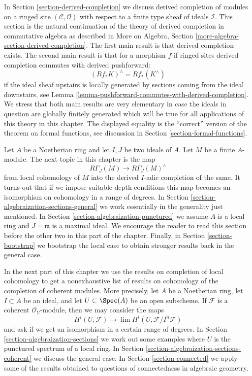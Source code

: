 \medskip\noindent
In Section \ref{section-derived-completion} we discuss derived completion
of modules on a ringed site $(\mathcal{C}, \mathcal{O})$
with respect to a finite type sheaf of ideals $\mathcal{I}$.
This section is the natural continuation of the theory of derived completion
in commutative algebra as described in
More on Algebra, Section \ref{more-algebra-section-derived-completion}.
The first main result is that derived completion exists.
The second main result is that for a morphism $f$ if ringed sites
derived completion commutes with derived pushforward:
$$
(Rf_*K)^\wedge = Rf_*(K^\wedge)
$$
if the ideal sheaf upstairs is locally generated by sections coming
from the ideal downstairs, see
Lemma \ref{lemma-pushforward-commutes-with-derived-completion}.
We stress that both main results are very elementary in case the
ideals in question are globally finitely generated which will
be true for all applications of this theory in this chapter.
The displayed equality is the ``correct'' version of the
theorem on formal functions, see discussion in
Section \ref{section-formal-functions}.

\medskip\noindent
Let $A$ be a Noetherian ring and let $I, J$ be two ideals of $A$.
Let $M$ be a finite $A$-module.
The next topic in this chapter is the map
$$
R\Gamma_J(M) \longrightarrow R\Gamma_J(M)^\wedge
$$
from local cohomology of $M$ into the derived $I$-adic completion
of the same. It turns out that if we impose suitable depth conditions
this map becomes an isomorphism on cohomology in a range of degrees.
In Section \ref{section-algebraization-sections-general}
we work essentially in the generality just mentioned.
In Section \ref{section-algebraization-punctured}
we assume $A$ is a local ring and $J = \mathfrak m$ is a maximal ideal.
We encourage the reader to read this section before the other two in
this part of the chapter.
Finally, in Section \ref{section-bootstrap} we bootstrap
the local case to obtain stronger results back in the general case.

\medskip\noindent
In the next part of this chapter we use the results on
completion of local cohomology to get a nonexhaustive list of results on
cohomology of the completion of coherent modules.
More precisely, let $A$ be a Noetherian ring, let $I \subset A$
be an ideal, and let $U \subset \Spec(A)$ be an open subscheme.
If $\mathcal{F}$ is a coherent $\mathcal{O}_U$-module, then
we may consider the maps
$$
H^i(U, \mathcal{F}) \longrightarrow \lim H^i(U, \mathcal{F}/I^n\mathcal{F})
$$
and ask if we get an isomorphism in a certain range of degrees.
In Section \ref{section-algebraization-sections}
we work out some examples where $U$ is the punctured spectrum
of a local ring. In Section \ref{section-algebraization-sections-coherent}
we discuss the general case.
In Section \ref{section-connected} we apply some of the results
obtained to questions of connectedness in algebraic geometry.

